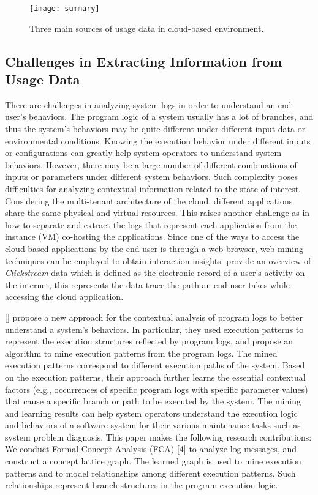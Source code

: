 \begin{figure*}[t!]
	\centering
	\texttt{[image: summary]}
	\caption{Three main sources of usage data in cloud-based environment.}
	\label{fig:schema}
\end{figure*}

\subsection{Challenges in Extracting Information from Usage Data}

There are challenges in analyzing system logs in order to understand an end-user’s behaviors. The program logic of a system usually has a lot of branches, and thus the system’s behaviors may be quite different under different input data or environmental conditions. Knowing the execution behavior under different inputs or configurations can greatly help system operators to understand system behaviors. However, there may be a large number of different combinations of inputs or parameters under different system behaviors. Such complexity poses difficulties for analyzing contextual information related to the state of interest. Considering the multi-tenant architecture of the cloud, different applications share the same physical and virtual resources. This raises another challenge as in how to separate and extract the logs that represent each application from the instance (VM) co-hosting the applications. 
%
Since one of the ways to access the cloud-based applications by the end-user is through a web-browser, web-mining techniques can be employed to obtain interaction insights. \cite{Bucklin2009} provide an overview of \emph{Clickstream} data which is defined as the electronic record of a user's activity on the internet, this represents the data trace the path an end-user takes while accessing the cloud application. 

[] propose a new approach for the contextual analysis of program logs to better understand a system’s behaviors. In particular, they used execution patterns to represent the execution structures reflected by program logs, and propose an algorithm to mine execution patterns from the program logs. The mined execution patterns correspond to different execution paths of the system. Based on the execution patterns, their approach further learns the essential contextual factors (e.g., occurrences of specific program logs with specific parameter values) that cause a specific branch or path to be executed by the system. 
% 
% 
%
The mining and learning results can help system operators understand the execution logic and behaviors of a software system for their various maintenance tasks such as system problem diagnosis. This paper makes the following research contributions: We conduct Formal Concept Analysis (FCA) [4] to analyze log messages, and construct a concept lattice graph. The learned graph is used to mine execution patterns and to model relationships among different execution patterns. Such relationships represent branch structures in the program execution logic.

